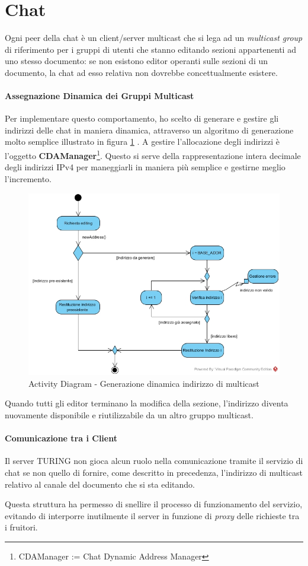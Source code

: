 \section{Chat}
Ogni peer della chat è un client/server multicast che si lega ad un \textit{multicast group} di riferimento per i gruppi di utenti che stanno editando sezioni appartenenti ad uno stesso documento: se non esistono editor operanti sulle sezioni di un documento, la chat ad esso relativa non dovrebbe concettualmente esistere.

\paragraph{Assegnazione Dinamica dei Gruppi Multicast}
Per implementare questo comportamento, ho scelto di generare e gestire gli indirizzi delle chat in maniera dinamica, attraverso un algoritmo di generazione molto semplice illustrato in figura \ref{fig:multicast_address_generation} . A gestire l'allocazione degli indirizzi è l'oggetto \textbf{CDAManager}\footnote{CDAManager := Chat Dynamic Address Manager}. Questo si serve della rappresentazione intera decimale degli indirizzi IPv4 per maneggiarli in maniera più semplice e gestirne meglio l'incremento.

\begin{figure}[h]
	\caption{Activity Diagram - Generazione dinamica indirizzo di multicast}
	\label{fig:multicast_address_generation}
	\includegraphics[scale=0.5]{assets/multicast_address_generation_algorithm.jpg}
\end{figure}

Quando tutti gli editor terminano la modifica della sezione, l'indirizzo diventa nuovamente disponibile e riutilizzabile da un altro gruppo multicast.

\paragraph{Comunicazione tra i Client}
Il server TURING non gioca alcun ruolo nella comunicazione tramite il servizio di chat se non quello di fornire, come descritto in precedenza, l'indirizzo di multicast relativo al canale del documento che si sta editando.

Questa struttura ha permesso di snellire il processo di funzionamento del servizio, evitando di interporre inutilmente il server in funzione di \textit{proxy} delle richieste tra i fruitori.
